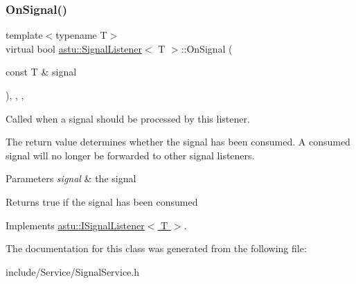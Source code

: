 \subsubsection{\texorpdfstring{On\+Signal()}{OnSignal()}}
{\footnotesize\ttfamily template$<$typename T$>$ \\
virtual bool \hyperlink{classastu_1_1SignalListener}{astu\+::\+Signal\+Listener}$<$ T $>$\+::On\+Signal (\begin{DoxyParamCaption}\item[{const T \&}]{signal }\end{DoxyParamCaption})\hspace{0.3cm}{\ttfamily [inline]}, {\ttfamily [override]}, {\ttfamily [protected]}, {\ttfamily [virtual]}}

Called when a signal should be processed by this listener.

The return value determines whether the signal has been consumed. A consumed signal will no longer be forwarded to other signal listeners.


\begin{DoxyParams}{Parameters}
{\em signal} & the signal \\
\hline
\end{DoxyParams}
\begin{DoxyReturn}{Returns}
{\ttfamily true} if the signal has been consumed 
\end{DoxyReturn}


Implements \hyperlink{classastu_1_1ISignalListener_a2ae8168f23b6daa3416f6e5995fd5d31}{astu\+::\+I\+Signal\+Listener$<$ T $>$}.



The documentation for this class was generated from the following file\+:\begin{DoxyCompactItemize}
\item 
include/\+Service/Signal\+Service.\+h\end{DoxyCompactItemize}
